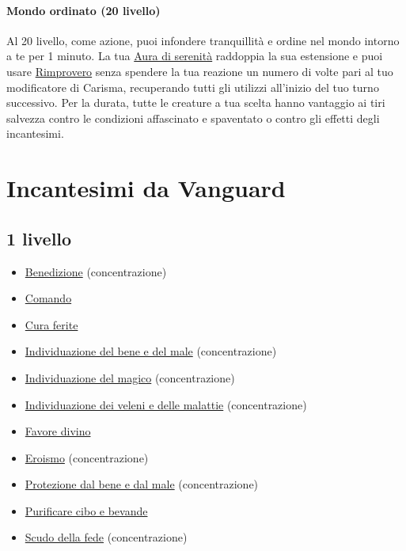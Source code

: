 \documentclass[a4paper,10pt,twoside,twocolumn,openany,bg=full,nodeprecatedcode]{dndbook}
\begin{document}
\subsubsection{Mondo ordinato (20\degree{} livello)}\label{mondo_ordinato_20_livello}
Al 20\degree{} livello, come azione, puoi infondere tranquillità e ordine nel mondo intorno a te per 1 minuto. La tua \hyperref[Oath_of_the_Exemplar_aura_of_serenity]{Aura di serenità} raddoppia la sua estensione e puoi usare \hyperref[Oath_of_the_Exemplar_rebuke]{Rimprovero} senza spendere la tua reazione un numero di volte pari al tuo modificatore di Carisma, recuperando tutti gli utilizzi all'inizio del tuo turno successivo. Per la durata, tutte le creature a tua scelta hanno vantaggio ai tiri salvezza contro le condizioni affascinato e spaventato o contro gli effetti degli incantesimi.

\chapter{Incantesimi da Vanguard}\label{incantesimi_da_vanguard}
\section{1\degree{} livello}\label{1_livello}
\begin{itemize}
  \item \hyperref[Bless_bless]{Benedizione} (concentrazione)
  \item \hyperref[Command_command]{Comando}
  \item \hyperref[Cure_Wounds_cure_wounds]{Cura ferite}
  \item \hyperref[Detect_Evil_and_Good_detect_evil_and_good]{Individuazione del bene e del male} (concentrazione)
  \item \hyperref[Detect_Magic_detect_magic]{Individuazione del magico} (concentrazione)
  \item \hyperref[Detect_Poison_and_Disease_detect_poison_and_disease]{Individuazione dei veleni e delle malattie} (concentrazione)
  \item \hyperref[Divine_Favor_divine_favor]{Favore divino}
  \item \hyperref[Heroism_heroism]{Eroismo} (concentrazione)
  \item \hyperref[Protection_from_Evil_and_Good_protection_from_evil_and_good]{Protezione dal bene e dal male} (concentrazione)
  \item \hyperref[Purify_Food_and_Drink_purify_food_and_drink]{Purificare cibo e bevande}
  \item \hyperref[Shield_of_Faith_shield_of_faith]{Scudo della fede} (concentrazione)
\end{itemize}
\end{document}
